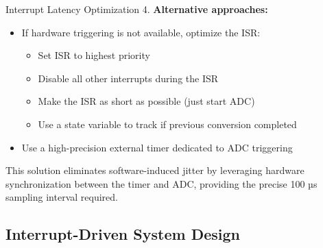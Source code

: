 \begin{example2}{Interrupt Latency Optimization}
4. \textbf{Alternative approaches:}
   \begin{itemize}
     \item If hardware triggering is not available, optimize the ISR:
     \begin{itemize}
       \item Set ISR to highest priority
       \item Disable all other interrupts during the ISR
       \item Make the ISR as short as possible (just start ADC)
       \item Use a state variable to track if previous conversion completed
     \end{itemize}
     \item Use a high-precision external timer dedicated to ADC triggering
   \end{itemize}

This solution eliminates software-induced jitter by leveraging hardware synchronization between the timer and ADC, providing the precise 100 µs sampling interval required.
\end{example2}

\subsection{Interrupt-Driven System Design}

